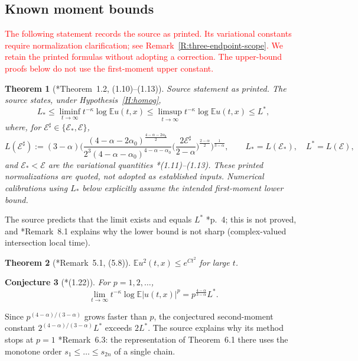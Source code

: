 \documentclass[12pt]{article}
\numberwithin{equation}{section}
\newtheorem{theorem}{Theorem}[section]
\newtheorem{conjecture}[theorem]{Conjecture}
\theoremstyle{definition}
\newcommand{\E}{\mathbb{E}}
\newcommand{\cE}{\mathcal{E}}
\newcommand{\myCmts}[1]{\begin{framed}\noindent\textcolor{red}{#1}\end{framed}}
\begin{document}
\subsection{Known moment bounds}

\myCmts{The following statement records the source as printed. Its
variational constants require normalization clarification; see
Remark~\ref{R:three-endpoint-scope}. We retain the printed formulas
without adopting a correction. The upper-bound proofs below do not
use the first-moment upper constant.}

\begin{theorem}[\cite{chen:author2026:time-dependency}*{Theorem~1.2, (1.10)--(1.13)}]\label{T:first}
  \emph{Source statement as printed.} The source states, under
  Hypothesis~\ref{H:homog},
  \[
    L_*\le\liminf_{t\to\infty}t^{-\kappa}\log\E u(t,x)
    \le\limsup_{t\to\infty}t^{-\kappa}\log\E u(t,x)\le L^*,
  \]
  where, for $\cE^\sharp\in\{\cE_*,\cE\}$,
  \[
    L(\cE^\sharp):=(3-\alpha)\bigg(
    \frac{(4-\alpha-2\alpha_0)^{\frac{4-\alpha-2\alpha_0}{2}}}
    {2^3(4-\alpha-\alpha_0)^{4-\alpha-\alpha_0}}
    \Big(\frac{2\cE^\sharp}{2-\alpha}\Big)^{\frac{2-\alpha}{2}}
    \bigg)^{\frac1{3-\alpha}},
    \qquad L_*=L(\cE_*),\quad L^*=L(\cE),
  \]
  and $\cE_*<\cE$ are the variational quantities
  \cite{chen:author2026:time-dependency}*{(1.11)--(1.13)}.
  These printed normalizations are quoted, not adopted as established
  inputs. Numerical calibrations using $L_*$ below explicitly assume
  the intended first-moment lower bound.
\end{theorem}

The source predicts that the limit exists and equals $L^*$
\cite{chen:author2026:time-dependency}*{p.~4}; this is not proved, and
\cite{chen:author2026:time-dependency}*{Remark~8.1} explains why the lower
bound is not sharp (complex-valued intersection local time).

\begin{theorem}[\cite{chen:author2026:time-dependency}*{Remark~5.1, (5.8)}]\label{T:crude}
  $\E u^2(t,x)\le e^{Ct^2}$ for large $t$.
\end{theorem}

\begin{conjecture}[\cite{chen:author2026:time-dependency}*{(1.22)}]\label{Conj:allp}
  For $p=1,2,\dots$,
  \[
    \lim_{t\to\infty}t^{-\kappa}\log\E|u(t,x)|^p
    =p^{\frac{4-\alpha}{3-\alpha}}L^*.
  \]
\end{conjecture}

Since $p^{(4-\alpha)/(3-\alpha)}$ grows faster than $p$, the conjectured
second-moment constant $2^{(4-\alpha)/(3-\alpha)}L^*$ exceeds $2L^*$.
The source explains why its method stops at $p=1$
\cite{chen:author2026:time-dependency}*{Remark~6.3}: the representation of
Theorem~6.1 there uses the monotone order $s_1\le\dots\le s_{2n}$ of a single
chain.
\end{document}
